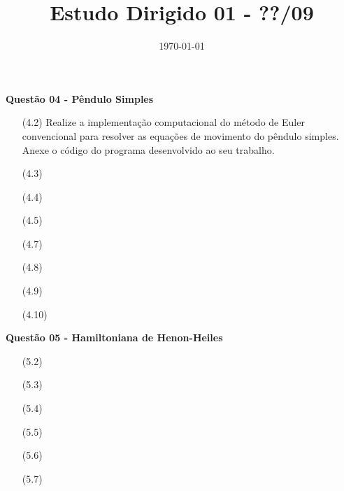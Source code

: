 \documentclass[a4paper]{article}
\date{\today}
\title{Estudo Dirigido 01 - ??/09}
\begin{document}
    \header{}

\textbf{Questão 04 - Pêndulo Simples}
\begin{center}
\begin{itemize}
    \item[(4.2)] Realize a implementação computacional do método de Euler convencional para resolver as equações de movimento do pêndulo simples. Anexe o código do programa desenvolvido ao seu trabalho.
    \item[(4.3)]        
    \item[(4.4)]
    \item[(4.5)]
    \item[(4.7)]    
    \item[(4.8)]
    \item[(4.9)]
    \item[(4.10)]
\end{itemize}
\end{center}

\textbf{Questão 05 - Hamiltoniana de Henon-Heiles}
\begin{center}
\begin{itemize}
    \item[(5.2)]
    \item[(5.3)]
    \item[(5.4)]
    \item[(5.5)]
    \item[(5.6)]
    \item[(5.7)]
\end{itemize}
\end{center}

    \begin{answer}[Ítem 4.2]
    \end{answer}

    \begin{answer}[Ítem 4.3]
    \end{answer}

    \begin{answer}[Ítem 4.4]
    \end{answer}

    \begin{answer}[Ítem 4.5]
    \end{answer}

    \begin{answer}[Ítem 4.7]
    \end{answer}

    \begin{answer}[Ítem 4.8]
    \end{answer}
\end{document}
